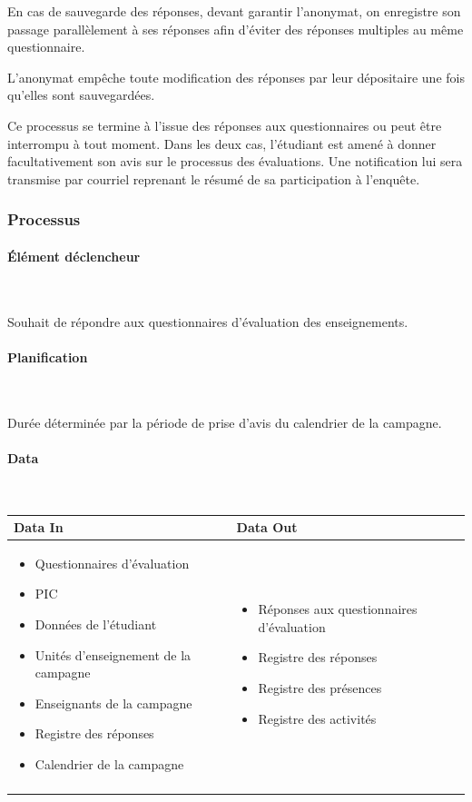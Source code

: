 \documentclass[a4paper,11pt]{report}
\begin{document}
En cas de sauvegarde des réponses, devant garantir l'anonymat, on enregistre son passage parallèlement à ses réponses afin d'éviter des réponses multiples au même questionnaire.

L'anonymat empêche toute modification des réponses par leur dépositaire une fois qu'elles sont sauvegardées.

Ce processus se termine à l'issue des réponses aux questionnaires ou peut être interrompu à tout moment.
Dans les deux cas, l'étudiant est amené à donner facultativement son avis sur le processus des évaluations.
Une notification lui sera transmise par courriel reprenant le résumé de sa participation à l'enquête.


\subsubsection{Processus}
\paragraph{Élément déclencheur}~\newline{}

Souhait de répondre aux questionnaires d'évaluation des enseignements.

\paragraph{Planification}~\newline{}

Durée déterminée par la période de prise d'avis du calendrier de la campagne.

\paragraph{Data}~\newline{}

\begin{tabularx}{\linewidth}{|X|X|} \hline
Data In & Data Out \\ \hline
\begin{itemize}
	\item Questionnaires d'évaluation
	\item PIC
	\item Données de l'étudiant
	\item Unités d'enseignement de la campagne
	\item Enseignants de la campagne
	\item Registre des réponses
	\item Calendrier de la campagne%
\end{itemize}
&
\begin{itemize}
	\item Réponses aux questionnaires d'évaluation
	\item Registre des réponses
	\item Registre des présences
	\item Registre des activités
\end{itemize}	
\\ 
 & \\ \hline
\end{tabularx}
\end{document}
